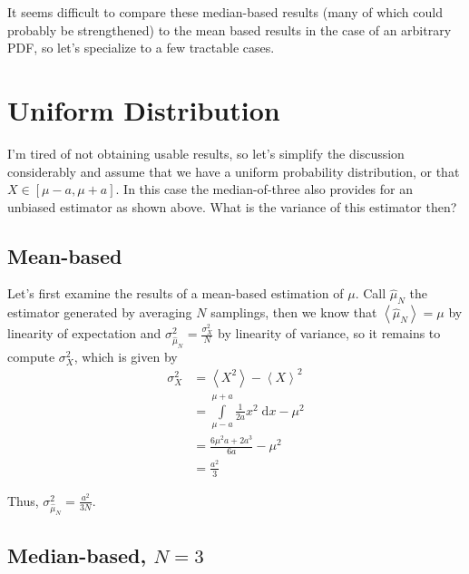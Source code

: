 \documentclass[12pt]{report}
\newcommand*{\ev}[1]{\left\langle#1\right\rangle}
\begin{document}
It seems difficult to compare these median-based results (many of which could
probably be strengthened) to the mean based results in the case of an arbitrary
PDF, so let's specialize to a few tractable cases.

\section{Uniform Distribution}

I'm tired of not obtaining usable results, so let's simplify the discussion
considerably and assume that we have a uniform probability distribution, or that
$X \in [\mu - a, \mu + a]$. In this case the median-of-three also provides for
an unbiased estimator as shown above.  What is the variance of this estimator
then?

\subsection{Mean-based}

Let's first examine the results of a mean-based estimation of $\mu$. Call
$\hat{\mu}_N$ the estimator generated by averaging $N$ samplings, then we know
that $\ev{\hat{\mu}_N} = \mu$ by linearity of expectation and
$\sigma_{\hat{\mu}_N}^2 = \frac{\sigma_X^2}{N}$ by linearity of variance, so
it remains to compute $\sigma_X^2$, which is given by
\begin{align}
    \sigma_X^2 &= \ev{X^2} - \ev{X}^2\\
    &= \int\limits_{\mu - a}^{\mu + a}\frac{1}{2a}x^2\;\mathrm{d}x - \mu^2\\
    &= \frac{6\mu^2a + 2a^3}{6a} - \mu^2\\
    &= \frac{a^2}{3}
\end{align}

Thus, $\sigma_{\hat{\mu}_N}^2 = \frac{a^2}{3N}$.

\subsection{Median-based, $N=3$}
\end{document}
